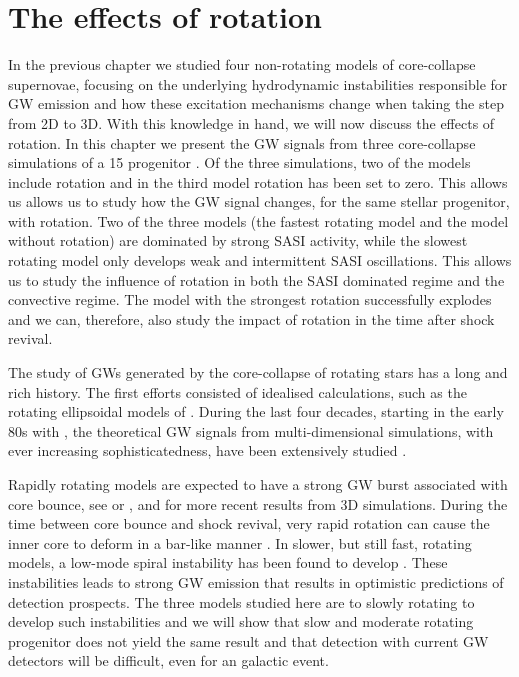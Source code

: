 

\chapter{The effects of rotation}
In the previous chapter we studied four non-rotating models of core-collapse
supernovae, focusing on the underlying hydrodynamic instabilities responsible
for GW emission and how these excitation mechanisms change when taking the step from
2D to 3D. With this knowledge in hand, we will now discuss the effects of rotation.
In this chapter we present the GW signals from three core-collapse simulations of a 15 \msun  
progenitor \citep{heger_05}. Of the three simulations, two of the models include rotation
and in the third model rotation has been set to zero. This allows us allows us to study
how the GW signal changes, for the same stellar progenitor, with rotation.
Two of the three models (the fastest rotating model and the model without rotation)
are dominated by strong SASI activity, while the slowest rotating model only develops weak and intermittent SASI oscillations. 
This allows us to study the influence of rotation in both the SASI dominated regime and the convective regime. The model with the strongest
rotation successfully explodes and we can, therefore, also study the impact of rotation in the time after shock revival.

The study of GWs generated by the core-collapse of rotating stars
has a long and rich history. The first efforts consisted of idealised calculations, 
such as the rotating ellipsoidal models of \cite{thuan_74,novikov_76,shapiro_77,saenz_78,saenz_79,saenz_81}.
During the last four decades, starting in the early 80s with \cite{mueller_82}, the theoretical GW signals from multi-dimensional
simulations, with ever increasing sophisticatedness, have been extensively studied 
\citep{mueller_82,finn_90,moenchmeyer_91,yamada_95,zwerger_97,rampp_98,dimmelmeier_01,dimmelmeier_phd,
dimmelmeier_02_b,kotake_03,ott_04,yamada_04,shibata_04,cerda_05,saijo_05,ott_05,shibata_05,kotake_06,
obergaulinger_06b,ott_phd,dimmelmeier_07_a,dimmelmeier_07_bb,dimmelmeier_08,reisswig_11,
takiwaki_11,ott_12,kuroda_14,fuller_15}.

Rapidly rotating models are expected to have a strong GW burst associated with core bounce, 
see \cite{mueller_82} or  \cite{kuroda_14}, and \cite{fuller_15} for more recent results from 3D simulations.
During the time between core bounce and shock revival, very rapid rotation can cause
the inner core to deform in a bar-like manner \citep{rampp_98,shibata_05}.
In slower, but still fast, rotating models, 
a low-mode spiral instability has been found to develop 
\citep{ott_05,kuroda_14,takiwaki_16}. These instabilities leads to strong
GW emission that results in optimistic predictions of detection prospects.
The three models studied here are to slowly rotating to develop such instabilities 
and we will show that slow and moderate rotating progenitor does not yield the same
result and that detection with current GW detectors will be difficult, even for an
galactic event.

